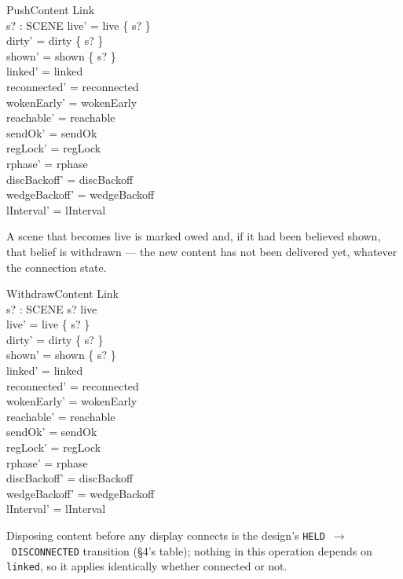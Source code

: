 \documentclass[a4paper,10pt,fleqn]{article}
\begin{document}
\begin{schema}{PushContent}
  \Delta Link \\
  s? : SCENE
\where
  live' = live \cup \{ s? \} \\
  dirty' = dirty \cup \{ s? \} \\
  shown' = shown \setminus \{ s? \} \\
  linked' = linked \\
  reconnected' = reconnected \\
  wokenEarly' = wokenEarly \\
  reachable' = reachable \\
  sendOk' = sendOk \\
  regLock' = regLock \\
  rphase' = rphase \\
  discBackoff' = discBackoff \\
  wedgeBackoff' = wedgeBackoff \\
  lInterval' = lInterval
\end{schema}

A scene that becomes live is marked owed and, if it had been believed
shown, that belief is withdrawn --- the new content has not been delivered
yet, whatever the connection state.

\begin{schema}{WithdrawContent}
  \Delta Link \\
  s? : SCENE
\where
  s? \in live \\
  live' = live \setminus \{ s? \} \\
  dirty' = dirty \setminus \{ s? \} \\
  shown' = shown \setminus \{ s? \} \\
  linked' = linked \\
  reconnected' = reconnected \\
  wokenEarly' = wokenEarly \\
  reachable' = reachable \\
  sendOk' = sendOk \\
  regLock' = regLock \\
  rphase' = rphase \\
  discBackoff' = discBackoff \\
  wedgeBackoff' = wedgeBackoff \\
  lInterval' = lInterval
\end{schema}

Disposing content before any display connects is the design's
\texttt{HELD}~$\to$~\texttt{DISCONNECTED} transition (\S4's table); nothing
in this operation depends on \texttt{linked}, so it applies identically
whether connected or not.
\end{document}
